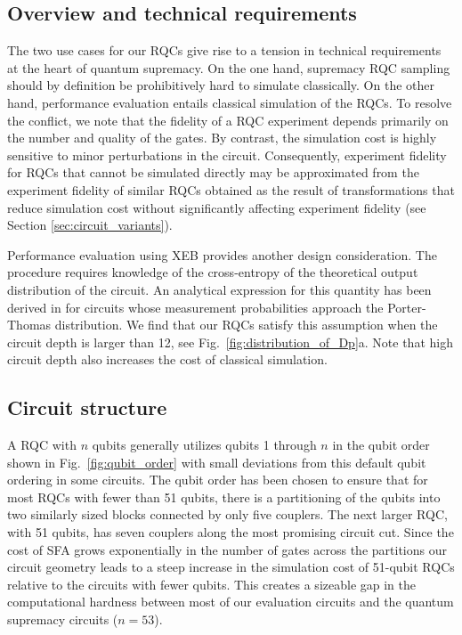 \subsection{Overview and technical requirements}
The two use cases for our RQCs give rise to a tension in technical requirements at the heart of quantum supremacy. On the one hand, supremacy RQC sampling should by definition be prohibitively hard to simulate classically. On the other hand, performance evaluation entails classical simulation of the RQCs. To resolve the conflict, we note that the fidelity of a RQC experiment depends primarily on the number and quality of the gates. By contrast, the simulation cost is highly sensitive to minor perturbations in the circuit. Consequently, experiment fidelity for RQCs that cannot be simulated directly may be approximated from the experiment fidelity of similar RQCs obtained as the result of transformations that reduce simulation cost without significantly affecting experiment fidelity (see Section \ref{sec:circuit_variants}).

Performance evaluation using XEB provides another design consideration. The procedure requires knowledge of the cross-entropy of the theoretical output distribution of the circuit. An analytical expression for this quantity has been derived in \cite{boixo2018characterizing} for circuits whose measurement probabilities approach the Porter-Thomas distribution. We find that our RQCs satisfy this assumption when the circuit depth is larger than 12, see Fig.~\ref{fig:distribution_of_Dp}a. Note that high circuit depth also increases the cost of classical simulation.

\subsection{Circuit structure}
A RQC with $n$ qubits generally utilizes qubits 1 through $n$ in the qubit order shown in Fig.~\ref{fig:qubit_order} with small deviations from this default qubit ordering in some circuits. The qubit order has been chosen to ensure that for most RQCs with fewer than 51 qubits, there is a partitioning of the qubits into two similarly sized blocks connected by only five couplers. The next larger RQC, with 51 qubits, has seven couplers along the most promising circuit cut. Since the cost of SFA grows exponentially in the number of gates across the partitions our circuit geometry leads to a steep increase in the simulation cost of 51-qubit RQCs relative to the circuits with fewer qubits. This creates a sizeable gap in the computational hardness between most of our evaluation circuits and the quantum supremacy circuits ($n = 53$).

